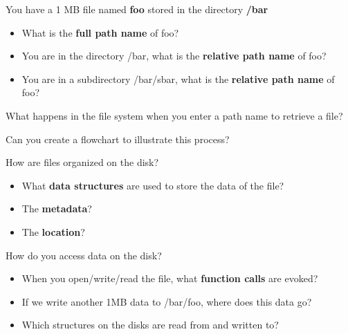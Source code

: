 \begin{slide}


    You have a 1 MB file named \textbf{foo} stored in the directory \textbf{/bar}
    \begin{itemize}
        \item What is the \textbf{full path name} of foo?
		\item You are in the directory /bar, what is the \textbf{relative path name} of foo?
		\item You are in a subdirectory /bar/sbar, what is the \textbf{relative path name} of foo?
    \end{itemize}
	\bigskip
	
	What happens in the file system when you enter a path name to retrieve a file?
	\bigskip
	
	Can you create a flowchart to illustrate this process?
\end{slide}

\begin{slide}


    How are files organized on the disk? 
    \begin{itemize}
        \item What \textbf{data structures} are used to store the data of the file?
        \item The \textbf{metadata}?
        \item The \textbf{location}?
    \end{itemize}
    \bigskip

    How do you access data on the disk?
    \begin{itemize}
        \item When you open/write/read the file, what \textbf{function calls} are evoked?
        \item If we write another 1MB data to /bar/foo, where does this data go?
        \item Which structures on the disks are read from and written to?
    \end{itemize}

\end{slide}

